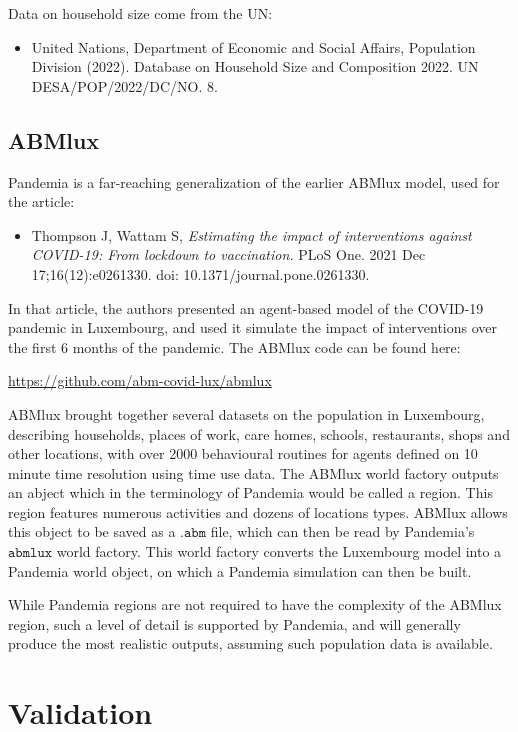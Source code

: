\documentclass[10pt,letterpaper]{article}
\begin{document}
\noindent Data on household size come from the UN:

\begin{itemize}
\item[] United Nations, Department of Economic and Social Affairs, Population Division (2022). Database on Household Size and Composition 2022. UN DESA/POP/2022/DC/NO. 8.
\end{itemize}

\subsection{ABMlux}

Pandemia is a far-reaching generalization of the earlier ABMlux model, used for the article:
\begin{itemize}
\item[] Thompson J, Wattam S, \textit{Estimating the impact of interventions against COVID-19: From lockdown to vaccination.} PLoS One. 2021 Dec 17;16(12):e0261330. doi: 10.1371/journal.pone.0261330.
\end{itemize}
In that article, the authors presented an agent-based model of the COVID-19 pandemic in Luxembourg, and used it simulate the impact of interventions over the first 6 months of the pandemic. The ABMlux code can be found here:
\begin{center}
\url{https://github.com/abm-covid-lux/abmlux}
\end{center}

ABMlux brought together several datasets on the population in Luxembourg, describing households, places of work, care homes, schools, restaurants, shops and other locations, with over 2000 behavioural routines for agents defined on 10 minute time resolution using time use data. The ABMlux world factory outputs an abject which in the terminology of Pandemia would be called a region. This region features numerous activities and dozens of locations types. ABMlux allows this object to be saved as a $\texttt{.abm}$ file, which can then be read by Pandemia's $\texttt{abmlux}$ world factory. This world factory converts the Luxembourg model into a Pandemia world object, on which a Pandemia simulation can then be built.

While Pandemia regions are not required to have the complexity of the ABMlux region, such a level of detail is supported by Pandemia, and will generally produce the most realistic outputs, assuming such population data is available.

\section{Validation}
\end{document}
